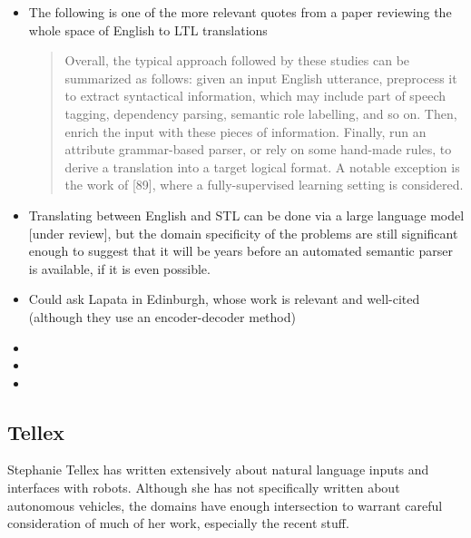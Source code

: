 \documentclass[a4paper, 11pt]{article}
\begin{document}
\begin{itemize}
\item  The following is one of the more relevant quotes from a paper reviewing
  the whole space of English to LTL translations
  \begin{quote}
Overall, the typical approach followed by these studies can be summarized as follows:
given an input English utterance, preprocess it to extract syntactical information, which may
include part of speech tagging, dependency parsing, semantic role labelling, and so on. Then,
enrich the input with these pieces of information. Finally, run an attribute grammar-based
parser, or rely on some hand-made rules, to derive a translation into a target logical format.
A notable exception is the work of [89], where a fully-supervised learning setting is considered.
\cite{brunello_et_al}
\end{quote}
\item Translating between English and STL can be done via a large language model 
\cite{he2021english} [under review], but the domain specificity of the problems
are still significant enough to suggest that it will be years before an
automated semantic parser is available, if it is even possible. 
\item Could ask Lapata in Edinburgh, whose work \cite{dong-lapata-2016-language}
  is relevant and well-cited (although they use an encoder-decoder method)
\item
\item
\item

\end{itemize}

\subsection{Tellex}

Stephanie Tellex has written extensively about natural language inputs and
interfaces with robots. Although she has not specifically written about
autonomous vehicles, the domains have enough intersection to warrant careful
consideration of much of her work, especially the recent stuff.
\end{document}
